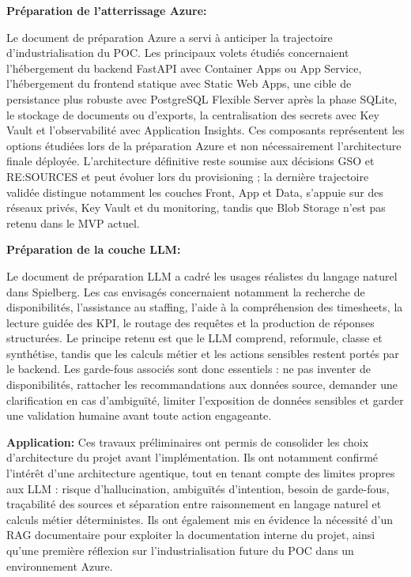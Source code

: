 \documentclass[a4paper,11pt,english,openany]{book}
\begin{document}
\textbf{Préparation de l'atterrissage Azure:}

Le document de préparation Azure a servi à anticiper la trajectoire d'industrialisation du POC. Les principaux volets étudiés concernaient l'hébergement du backend FastAPI avec Container Apps ou App Service, l'hébergement du frontend statique avec Static Web Apps, une cible de persistance plus robuste avec PostgreSQL Flexible Server après la phase SQLite, le stockage de documents ou d'exports, la centralisation des secrets avec Key Vault et l'observabilité avec Application Insights. Ces composants représentent les options étudiées lors de la préparation Azure et non nécessairement l'architecture finale déployée. L'architecture définitive reste soumise aux décisions GSO et RE:SOURCES et peut évoluer lors du provisioning ; la dernière trajectoire validée distingue notamment les couches Front, App et Data, s'appuie sur des réseaux privés, Key Vault et du monitoring, tandis que Blob Storage n'est pas retenu dans le MVP actuel.

\textbf{Préparation de la couche LLM:}

Le document de préparation LLM a cadré les usages réalistes du langage naturel dans Spielberg. Les cas envisagés concernaient notamment la recherche de disponibilités, l'assistance au staffing, l'aide à la compréhension des timesheets, la lecture guidée des KPI, le routage des requêtes et la production de réponses structurées. Le principe retenu est que le LLM comprend, reformule, classe et synthétise, tandis que les calculs métier et les actions sensibles restent portés par le backend. Les garde-fous associés sont donc essentiels : ne pas inventer de disponibilités, rattacher les recommandations aux données source, demander une clarification en cas d'ambiguïté, limiter l'exposition de données sensibles et garder une validation humaine avant toute action engageante.

\textbf{Application:}
Ces travaux préliminaires ont permis de consolider les choix d'architecture du projet avant l'implémentation. Ils ont notamment confirmé l'intérêt d'une architecture agentique, tout en tenant compte des limites propres aux LLM : risque d'hallucination, ambiguïtés d'intention, besoin de garde-fous, traçabilité des sources et séparation entre raisonnement en langage naturel et calculs métier déterministes. Ils ont également mis en évidence la nécessité d'un RAG documentaire pour exploiter la documentation interne du projet, ainsi qu'une première réflexion sur l'industrialisation future du POC dans un environnement Azure.
\end{document}
